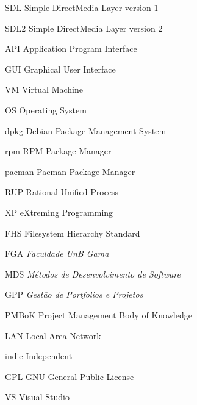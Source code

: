 \begin{siglas}
  \item[SDL] Simple DirectMedia Layer version 1
  \item[SDL2] Simple DirectMedia Layer version 2
  \item[API] Application Program Interface
  \item[GUI] Graphical User Interface
  \item[VM] Virtual Machine
  \item[OS] Operating System
  \item[dpkg] Debian Package Management System
  \item[rpm] RPM Package Manager
  \item[pacman] Pacman Package Manager
  \item[RUP] Rational Unified Process
  \item[XP] eXtreming Programming
  \item[FHS] Filesystem Hierarchy Standard
  \item[FGA] \textit{Faculdade UnB Gama}
  \item[MDS] \textit{M\'etodos de Desenvolvimento de Software}
  \item[GPP] \textit{Gest\~ao de Portfolios e Projetos}
  \item[PMBoK] Project Management Body of Knowledge
  \item[LAN] Local Area Network
  \item[indie] Independent
  \item[GPL] GNU General Public License
  \item[VS] Visual Studio
\end{siglas}
